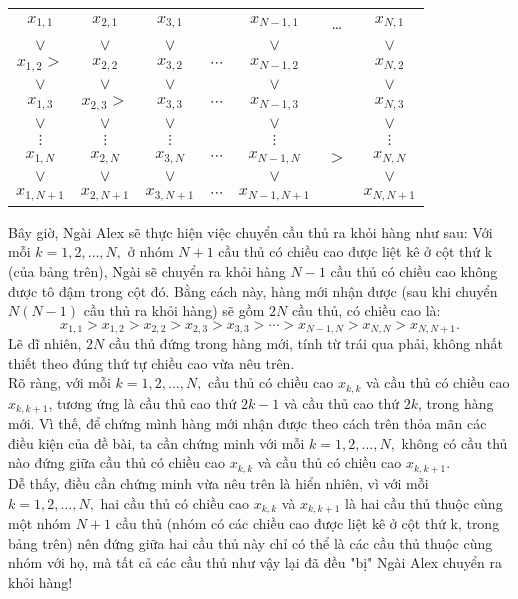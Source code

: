 \begin{bt}
{		\renewcommand{\arraystretch}{1.5}
		\begin{center}
			\begin{tabular}{ccccccc}
				$x_{1,1}$&$x_{2,1}$&$x_{3,1}$&&$x_{N-1,1}$&\dots&$x_{N,1}$\\
				$\vee $&$\vee $&$\vee $&&$\vee $&&$\vee $\\
				$x_{1,2}>$&$x_{2,2}$&$x_{3,2}$&$\cdots $&$x_{N-1,2}$&&$x_{N,2}$\\
				$\vee $&$\vee $&$\vee $&&$\vee $&&$\vee $\\
				$x_{1,3}$&$x_{2,3}>$&$x_{3,3}$&$\cdots $&$x_{N-1,3}$&&$x_{N,3}$\\
				$\vee $&$\vee $&$\vee $&&$\vee $&&$\vee $\\
				$\vdots$&$\vdots $&$\vdots$&&$\vdots$&&$\vdots$\\
				$x_{1,N}$&$x_{2,N}$&$x_{3,N}$&$\cdots $&$x_{N-1,N}$&$>$&$x_{N,N}$\\
				$\vee $&$\vee $&$\vee $&&$\vee $&&$\vee $\\
				$x_{1,N+1}$&$x_{2,N+1}$&$x_{3,N+1}$&$\cdots $&$x_{N-1,N+1}$&&$x_{N,N+1}$
			\end{tabular}
		\end{center}
		Bây giờ, Ngài Alex sẽ thực hiện việc chuyển cầu thủ ra khỏi hàng như sau: Với mỗi $k=1,2,\ldots,N,$ ở nhóm $N+1$ cầu thủ có chiều cao được liệt kê ở cột thứ k (của bảng trên), Ngài sẽ chuyển ra khỏi hàng $N-1$ cầu thủ có chiều cao không được tô đậm trong cột đó. Bằng cách này, hàng mới nhận được (sau khi chuyển $N(N-1)$ cầu thủ ra khỏi hàng) sẽ gồm $2N$ cầu thủ, có chiều cao là:
		$$ x_{1,1}>x_{1,2}>x_{2,2}>x_{2,3}>x_{3,3}>\cdots>x_{N-1,N}>x_{N,N}>x_{N,N+1}.$$
		Lẽ dĩ nhiên, $2N$ cầu thủ đứng trong hàng mới, tính từ trái qua phải, không nhất thiết theo đúng thứ tự chiều cao vừa nêu trên.\\
		Rõ ràng, với mỗi $k=1,2,\ldots,N,$ cầu thủ có chiều cao $x_{k,k}$ và cầu thủ có chiều cao $x_{k,k+1}$, tương ứng là cầu thủ cao thứ $2k-1$ và cầu thủ cao thứ $2k$, trong hàng mới. Vì thế, để chứng mình hàng mới nhận được theo cách trên thỏa mãn các điều kiện của đề bài, ta cần chứng minh với mỗi $k=1,2,\ldots,N,$ không có cầu thủ nào đứng giữa cầu thủ có chiều cao $x_{k,k}$ và cầu thủ có chiều cao $x_{k,k+1}$.\\
		Dễ thấy, điều cần chứng minh vừa nêu trên là hiển nhiên, vì với mỗi $k=1,2,\ldots,N,$ hai cầu thủ có chiều cao $x_{k,k}$ và $x_{k,k+1}$ là hai cầu thủ thuộc cùng một nhóm $N+1$ cầu thủ (nhóm có các chiều cao được liệt kê ở cột thứ k, trong bảng trên) nên đứng giữa hai cầu thủ này chỉ có thể là các cầu thủ thuộc cùng nhóm với họ, mà tất cả các cầu thủ như vậy lại đã đều "bị" Ngài Alex chuyển ra khỏi hàng!\\
}
\end{bt}
